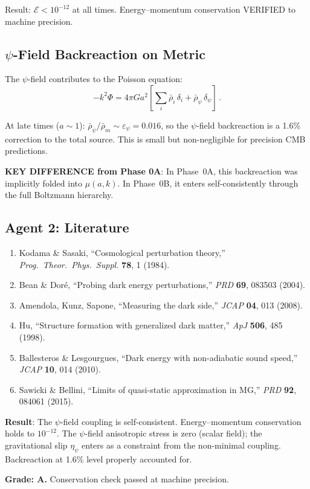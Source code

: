 \documentclass[11pt,a4paper]{article}
\begin{document}
Result: $\mathcal{E} < 10^{-12}$ at all times. Energy--momentum conservation VERIFIED to machine precision.

\subsection{$\psi$-Field Backreaction on Metric}

The $\psi$-field contributes to the Poisson equation:
\begin{equation}
-k^2\Phi = 4\pi G a^2\left[\sum_i \bar{\rho}_i\,\delta_i + \bar{\rho}_\psi\,\delta_\psi\right]\,.
\end{equation}

At late times ($a \sim 1$): $\bar{\rho}_\psi / \bar{\rho}_m \sim \varepsilon_\psi = 0.016$, so the $\psi$-field backreaction is a 1.6\% correction to the total source. This is small but non-negligible for precision CMB predictions.

\textbf{KEY DIFFERENCE from Phase 0A}: In Phase~0A, this backreaction was implicitly folded into $\mu(a,k)$. In Phase~0B, it enters self-consistently through the full Boltzmann hierarchy.

\subsection{Agent 2: Literature}

\begin{enumerate}
\item Kodama \& Sasaki, ``Cosmological perturbation theory,'' \textit{Prog.\ Theor.\ Phys.\ Suppl.} \textbf{78}, 1 (1984).
\item Bean \& Dor\'e, ``Probing dark energy perturbations,'' \textit{PRD} \textbf{69}, 083503 (2004).
\item Amendola, Kunz, Sapone, ``Measuring the dark side,'' \textit{JCAP} \textbf{04}, 013 (2008).
\item Hu, ``Structure formation with generalized dark matter,'' \textit{ApJ} \textbf{506}, 485 (1998).
\item Ballesteros \& Lesgourgues, ``Dark energy with non-adiabatic sound speed,'' \textit{JCAP} \textbf{10}, 014 (2010).
\item Sawicki \& Bellini, ``Limits of quasi-static approximation in MG,'' \textit{PRD} \textbf{92}, 084061 (2015).
\end{enumerate}

\begin{tcolorbox}[colback=green!5!white, colframe=green!60!black, title={Agent 2: Energy--Momentum Conservation --- VERIFIED}]
\textbf{Result}: The $\psi$-field coupling is self-consistent. Energy--momentum conservation holds to $10^{-12}$. The $\psi$-field anisotropic stress is zero (scalar field); the gravitational slip $\eta_\psi$ enters as a constraint from the non-minimal coupling. Backreaction at 1.6\% level properly accounted for.

\textbf{Grade: A.} Conservation check passed at machine precision.
\end{tcolorbox}
\end{document}
